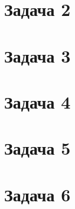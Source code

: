 \documentclass[a4paper]{article}
\begin{document}
\section*{Задача 2}
\section*{Задача 3}
\section*{Задача 4}
\section*{Задача 5}
\section*{Задача 6}
\end{document}
